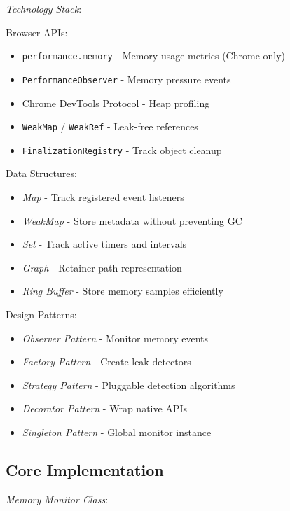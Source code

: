 \documentclass[11pt]{article}
\begin{document}
\emph{Technology Stack}:

Browser APIs:

\begin{itemize}
\item \texttt{performance.memory} - Memory usage metrics (Chrome only)
\item \texttt{PerformanceObserver} - Memory pressure events
\item Chrome DevTools Protocol - Heap profiling
\item \texttt{WeakMap} / \texttt{WeakRef} - Leak-free references
\item \texttt{FinalizationRegistry} - Track object cleanup
\end{itemize}

Data Structures:

\begin{itemize}
\item \emph{Map} - Track registered event listeners
\item \emph{WeakMap} - Store metadata without preventing GC
\item \emph{Set} - Track active timers and intervals
\item \emph{Graph} - Retainer path representation
\item \emph{Ring Buffer} - Store memory samples efficiently
\end{itemize}

Design Patterns:

\begin{itemize}
\item \emph{Observer Pattern} - Monitor memory events
\item \emph{Factory Pattern} - Create leak detectors
\item \emph{Strategy Pattern} - Pluggable detection algorithms
\item \emph{Decorator Pattern} - Wrap native APIs
\item \emph{Singleton Pattern} - Global monitor instance
\end{itemize}
\subsection{Core Implementation}
\label{sec:org21292af}

\emph{Memory Monitor Class}:
\end{document}
